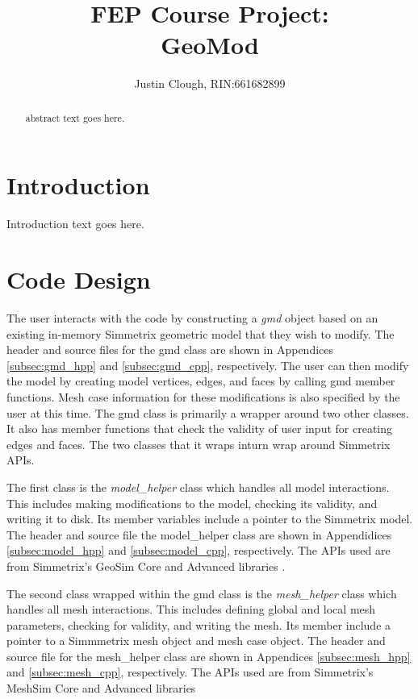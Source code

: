 \documentclass[a4paper, 12pt]{article}
\author{Justin Clough, RIN:661682899}
\title{FEP Course Project: \\
        GeoMod}
\begin{document}
\maketitle

\begin{abstract}
abstract text goes here.

\end{abstract}

\section{Introduction} \label{sec:intro}
Introduction text goes here.

\section{Code Design} \label{sec:design}
The user interacts with the code by constructing a \emph{gmd}
object based on an existing in-memory Simmetrix geometric model that they 
wish to modify. The header and source files for the gmd class 
are shown in Appendices \ref{subsec:gmd_hpp} and \ref{subsec:gmd_cpp}, 
respectively.  The user can then modify the model by 
creating model vertices, edges, and faces by calling
gmd member functions. Mesh case information for these 
modifications is also specified by the user at this time. 
The gmd class is primarily a wrapper around two other classes. It also
has member functions that check the validity of user input for creating 
edges and faces. The two classes that it wraps inturn wrap around Simmetrix APIs.

The first class is the \emph{model\_helper} class 
which handles all model interactions. This includes making modifications to
the model, checking its validity, and writing it to disk. Its member variables
include a pointer to the Simmetrix model. The header and source file the 
model\_helper class are shown in Appendidices \ref{subsec:model_hpp} and 
\ref{subsec:model_cpp}, respectively. The APIs used are from Simmetrix's 
GeoSim Core and Advanced libraries \cite{Simmetrix}. 

The second class wrapped within the gmd class is the
\emph{mesh\_helper} class which handles all mesh interactions. This includes
defining global and local mesh parameters, checking for validity, and writing the
mesh. Its member include a pointer to a Simmmetrix mesh object and mesh case object. 
The header and source file for the mesh\_helper class are shown in 
Appendices \ref{subsec:mesh_hpp} and \ref{subsec:mesh_cpp}, respectively.
The APIs used are from Simmetrix's MeshSim Core and Advanced libraries 
\cite{Simmetrix}
\end{document}
